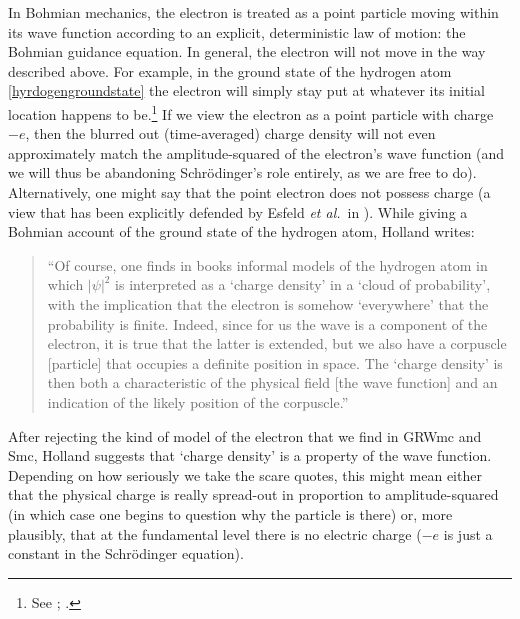 \documentclass[12pt,onecolumn,secnumarabic,amsmath,amssymb,balancelastpage,nofootinbib]{article}
\begin{document}
In Bohmian mechanics, the electron is treated as a point particle moving within its wave function according to an explicit, deterministic law of motion: the Bohmian guidance equation.  In general, the electron will not move in the way described above.  For example, in the ground state of the hydrogen atom \eqref{hyrdogengroundstate} the electron will simply stay put at whatever its initial location happens to be.\footnote{See \cite[pg.\ 153]{holland}; \cite[pg.\ 154]{durrtteufel}.}  If we view the electron as a point particle with charge $-e$, then the blurred out (time-averaged) charge density will not even approximately match the amplitude-squared of the electron's wave function (and we will thus be abandoning Schr\"{o}dinger's role entirely, as we are free to do).  Alternatively, one might say that the point electron does not possess charge (a view that has been explicitly defended by Esfeld \emph{et al.}\ in \cite{esfeld2017, esfeld2018, esfeld2020}).  While giving a Bohmian account of the ground state of the hydrogen atom, Holland writes:
\begin{quote}
``Of course, one finds in books informal models of the hydrogen atom in which $|\psi|^2$ is interpreted as a `charge density' in a `cloud of probability', with the implication that the electron is somehow `everywhere' that the probability is finite. Indeed, since for us the wave is a component of the electron, it is true that the latter is extended, but we also have a corpuscle [particle] that occupies a definite position in space.  The `charge density' is then both a characteristic of the physical field [the wave function] and an indication of the likely position of the corpuscle.'' \cite[pg.\ 155]{holland}
\end{quote}
After rejecting the kind of model of the electron that we find in GRWmc and Smc, Holland suggests that `charge density' is a property of the wave function.  Depending on how seriously we take the scare quotes, this might mean either that the physical charge is really spread-out in proportion to amplitude-squared (in which case one begins to question why the particle is there) or, more plausibly, that at the fundamental level there is no electric charge ($-e$ is just a constant in the Schr\"{o}dinger equation).
\end{document}
